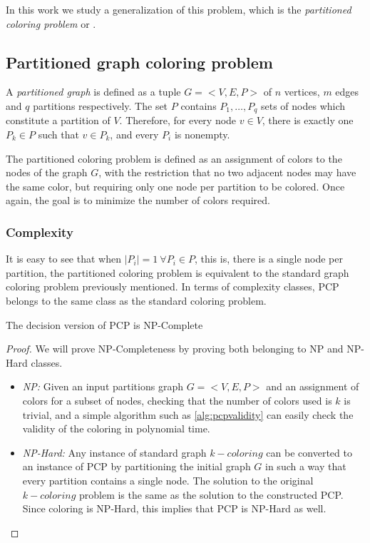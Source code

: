 In this work we study a generalization of this problem, which is the \textit{partitioned coloring problem} or \PCP.

\subsection{Partitioned graph coloring problem}

A \textit{partitioned graph} is defined as a tuple $G = <V,E,P>$ of $n$ vertices, $m$ edges and $q$ partitions respectively. The set $P$ contains $P_1, \ldots ,P_q$ sets of nodes which constitute a partition of $V$. Therefore, for every node $v \in V$, there is exactly one $P_k \in P$ such that $v \in P_k$, and every $P_i$ is nonempty.

The partitioned coloring problem is defined as an assignment of colors to the nodes of the graph $G$, with the restriction that no two adjacent nodes may have the same color, but requiring only one node per partition to be colored. Once again, the goal is to minimize the number of colors required.

\subsubsection*{Complexity}

It is easy to see that when $|P_i| = 1\ \forall P_i \in P$, this is, there is a single node per partition, the partitioned coloring problem is equivalent to the standard graph coloring problem previously mentioned. In terms of complexity classes, PCP belongs to the same class as the standard coloring problem.

\begin{theorem}
The decision version of PCP is NP-Complete
\end{theorem}

\begin{proof}
We will prove NP-Completeness by proving both belonging to NP and NP-Hard classes.

\begin{itemize}
\item{\textit{NP:} Given an input partitions graph $G = <V,E,P>$ and an assignment of colors for a subset of nodes, checking that the number of colors used is $k$ is trivial, and a simple algorithm such as \ref{alg:pcpvalidity} can easily check the validity of the coloring in polynomial time.}
\item{\textit{NP-Hard:} Any instance of standard graph $k-coloring$ can be converted to an instance of PCP by partitioning the initial graph $G$ in such a way that every partition contains a single node. The solution to the original $k-coloring$ problem is the same as the solution to the constructed PCP. Since coloring is NP-Hard, this implies that PCP is NP-Hard as well.}
\end{itemize}

\end{proof}

